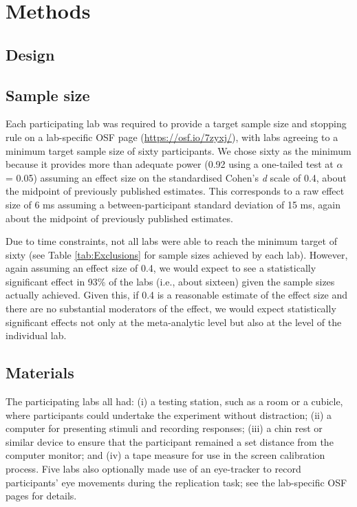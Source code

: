 \documentclass[A4paper,man,floatsintext]{apa6}
\theoremstyle{definition}
\theoremstyle{definition}
\theoremstyle{definition}
\theoremstyle{remark}
\begin{document}
\section{Methods}\label{methods}

\subsection{Design}\label{design}

\subsection{Sample size}\label{sample-size}

Each participating lab was required to provide a target sample size and
stopping rule on a lab-specific OSF page (\url{https://osf.io/7zyxj/}),
with labs agreeing to a minimum target sample size of sixty
participants. We chose sixty as the minimum because it provides more
than adequate power (0.92 using a one-tailed test at \(\alpha\) = 0.05)
assuming an effect size on the standardised Cohen's \emph{d} scale of
0.4, about the midpoint of previously published estimates. This
corresponds to a raw effect size of 6 ms assuming a between-participant
standard deviation of 15 ms, again about the midpoint of previously
published estimates.

Due to time constraints, not all labs were able to reach the minimum
target of sixty (see Table \ref{tab:Exclusions} for sample sizes
achieved by each lab). However, again assuming an effect size of 0.4, we
would expect to see a statistically significant effect in 93\% of the
labs (i.e., about sixteen) given the sample sizes actually achieved.
Given this, if 0.4 is a reasonable estimate of the effect size and there
are no substantial moderators of the effect, we would expect
statistically significant effects not only at the meta-analytic level
but also at the level of the individual lab.

\subsection{Materials}\label{materials}

The participating labs all had: (i) a testing station, such as a room or
a cubicle, where participants could undertake the experiment without
distraction; (ii) a computer for presenting stimuli and recording
responses; (iii) a chin rest or similar device to ensure that the
participant remained a set distance from the computer monitor; and (iv)
a tape measure for use in the screen calibration process. Five labs also
optionally made use of an eye-tracker to record participants' eye
movements during the replication task; see the lab-specific OSF pages
for details.
\end{document}
